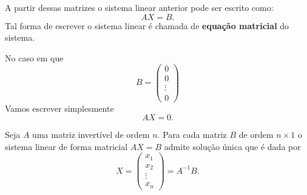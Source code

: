 A partir dessas matrizes o sistema linear anterior pode ser escrito como:
\[
    AX = B.
\]
Tal forma de escrever o sistema linear é chamada de \textbf{equação matricial} do sistema.

No caso em que
\[
    B = \begin{pmatrix}
        0\\0\\\vdots\\0
    \end{pmatrix}
\]
Vamos escrever simplesmente
\[
    AX = 0.
\]

\begin{teorema}
    Seja $A$ uma matriz invertível de ordem $n$. Para cada matriz $B$ de ordem $n\times 1$ o sistema linear de forma matricial $AX = B$ admite solução única que é dada por
    \[
        X = \begin{pmatrix}
            x_1 \\ x_2 \\ \vdots \\ x_n
        \end{pmatrix} = A^{-1}B.
    \]
\end{teorema}

